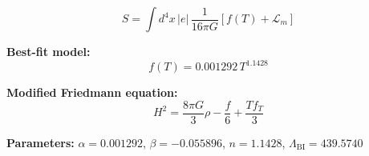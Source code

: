 
\begin{equation}
  S = \int d^4x \, |e| \, \frac{1}{16\pi G} \left[ f(T) + \mathcal{L}_m \right]
\end{equation}

\textbf{Best-fit model:}
\begin{equation}
  f(T) = 0.001292 \, T^{1.1428}
\end{equation}

\textbf{Modified Friedmann equation:}
\begin{equation}
  H^2 = \frac{8\pi G}{3} \rho - \frac{f}{6} + \frac{T f_T}{3}
\end{equation}

\textbf{Parameters:}
$\alpha = 0.001292$, \quad
$\beta = -0.055896$, \quad
$n = 1.1428$, \quad
$\Lambda_{\text{BI}} = 439.5740$